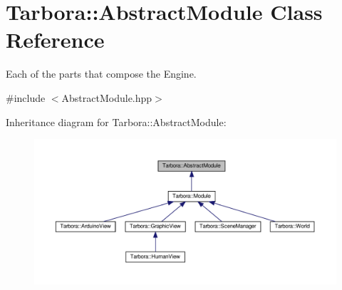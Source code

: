 \hypertarget{classTarbora_1_1AbstractModule}{}\section{Tarbora\+:\+:Abstract\+Module Class Reference}
\label{classTarbora_1_1AbstractModule}


Each of the parts that compose the Engine.  




{\ttfamily \#include $<$Abstract\+Module.\+hpp$>$}



Inheritance diagram for Tarbora\+:\+:Abstract\+Module\+:\nopagebreak
\begin{figure}[H]
\begin{center}
\leavevmode
\includegraphics[width=350pt]{classTarbora_1_1AbstractModule__inherit__graph}
\end{center}
\end{figure}
